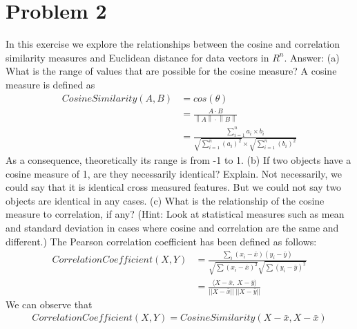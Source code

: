 \documentclass[paper=a4, fontsize=11pt]{scrartcl} %
\numberwithin{equation}{section} %
\numberwithin{figure}{section} %
\numberwithin{table}{section} %
\newcommand{\norm}[1]{\left\lVert#1\right\rVert}
\begin{document}
\section{Problem 2}
In this exercise we explore the relationships between the cosine and correlation similarity measures and Euclidean distance for data vectors in $R^n$.
\newline
Answer:
\newline
\newline
(a) What is the range of values that are possible for the cosine measure?
\newline
\newline
A cosine measure is defined as 
\begin{align}
CosineSimilarity(A,B) &= cos(\theta) \\ 
&= \frac{A\cdot{B} }{\norm{A}\cdot\norm{B}} \\ 
&= \frac{\sum\limits_{i=1}^n a_i \times b_i}{\sqrt{\sum\limits_{i=1}^n(a_i)^2}\times\sqrt{\sum\limits_{i=1}^n(b_i)^2} }
\end{align}
As a consequence, theoretically its range is from -1 to 1.
\newline
\newline
(b) If two objects have a cosine measure of 1, are they necessarily identical? Explain.
\newline
\newline
Not necessarily, we could say that it is identical cross measured features. But we could not say two objects are identical in any cases.
\newline
\newline
(c) What is the relationship of the cosine measure to correlation, if any? (Hint: Look at statistical measures
such as mean and standard deviation in cases where cosine and correlation are the same and different.)
\newline
\newline
The Pearson correlation coefficient has been defined as follows:
\begin{align} 
CorrelationCoefficient(X,Y) &= \frac{ \sum_i (x_i-\bar{x}) (y_i-\bar{y}) }{ 
\sqrt{\sum (x_i-\bar{x})^2} \sqrt{ \sum (y_i-\bar{y})^2 } } 
\\ 
& = \frac{\langle X-\bar{x},\ X-\bar{y} \rangle}{ 
||X-\bar{x}||\ ||X-\bar{y}||}  
\end{align}
We can observe that \begin{align}
CorrelationCoefficient(X,Y) = CosineSimilarity(X-\bar{x}, X-\bar{x})
\end{align}  
\end{document}

